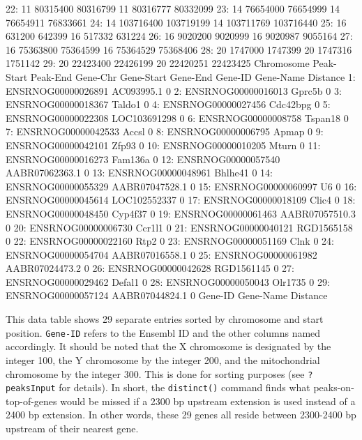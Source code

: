 \documentclass[12pt]{article}
\begin{document}
\begin{Schunk}
\begin{Soutput}
22:         11   80315400  80316799       11   80316777  80332099
23:         14   76654000  76654999       14   76654911  76833661
24:         14  103716400 103719199       14  103711769 103716440
25:         16     631200    642399       16     517332    631224
26:         16    9020200   9020999       16    9020987   9055164
27:         16   75363800  75364599       16   75364529  75368406
28:         20    1747000   1747399       20    1747316   1751142
29:         20   22423400  22426199       20   22420251  22423425
    Chromosome Peak-Start  Peak-End Gene-Chr Gene-Start  Gene-End
               Gene-ID      Gene-Name Distance
 1: ENSRNOG00000026891     AC093995.1        0
 2: ENSRNOG00000016013         Gprc5b        0
 3: ENSRNOG00000018367         Taldo1        0
 4: ENSRNOG00000027456       Cdc42bpg        0
 5: ENSRNOG00000022308   LOC103691298        0
 6: ENSRNOG00000008758        Tspan18        0
 7: ENSRNOG00000042533          Accsl        0
 8: ENSRNOG00000006795          Apmap        0
 9: ENSRNOG00000042101          Zfp93        0
10: ENSRNOG00000010205          Mturn        0
11: ENSRNOG00000016273        Fam136a        0
12: ENSRNOG00000057540 AABR07062363.1        0
13: ENSRNOG00000048961        Bhlhe41        0
14: ENSRNOG00000055329 AABR07047528.1        0
15: ENSRNOG00000060997             U6        0
16: ENSRNOG00000045614   LOC102552337        0
17: ENSRNOG00000018109          Clic4        0
18: ENSRNOG00000048450        Cyp4f37        0
19: ENSRNOG00000061463 AABR07057510.3        0
20: ENSRNOG00000006730         Ccr1l1        0
21: ENSRNOG00000040121     RGD1565158        0
22: ENSRNOG00000022160           Rtp2        0
23: ENSRNOG00000051169           Clnk        0
24: ENSRNOG00000054704 AABR07016558.1        0
25: ENSRNOG00000061982 AABR07024473.2        0
26: ENSRNOG00000042628     RGD1561145        0
27: ENSRNOG00000029462         Defal1        0
28: ENSRNOG00000050043        Olr1735        0
29: ENSRNOG00000057124 AABR07044824.1        0
               Gene-ID      Gene-Name Distance
\end{Soutput}
\end{Schunk}

This data table shows 29 separate entries sorted by chromosome and start position.  \texttt{Gene-ID} refers to the Ensembl ID and the other columns named accordingly. It should be noted that the X chromosome is designated by the integer 100, the Y chromosome by the integer 200, and the mitochondrial chromosome by the integer 300.  This is done for sorting purposes (see \texttt{?peaksInput} for details).  In short, the \texttt{distinct()} command finds what peaks-on-top-of-genes would be missed if a 2300 bp upstream extension is used instead of a 2400 bp extension.  In other words, these 29 genes all reside between 2300-2400 bp upstream of their nearest gene.
\end{document}
